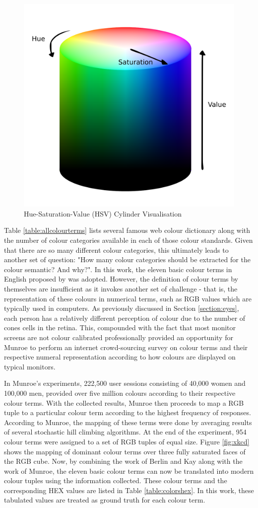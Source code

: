 \begin{figure}[hbt!]\centering
\includegraphics[width=.5\textwidth]{image/general/HSV.png}
\caption{Hue-Saturation-Value (HSV) Cylinder Visualisation}
\label{fig:hsvcylinder}
\end{figure}



Table \ref{table:allcolourterms} lists several famous web colour dictionary along with the number of colour categories available in each of those colour standards. Given that there are so many different colour categories, this ultimately leads to another set of question: "How many colour categories should be extracted for the colour semantic? And why?". In this work, the eleven basic colour terms in English proposed by \cite{berlinandkay} was adopted.
However, the definition of colour terms by themselves are insufficient as it invokes another set of challenge - that is, the representation of these colours in numerical terms, such as RGB values which are typically used in computers. As previously discussed in Section \ref{section:eyes}, each person has a relatively different perception of colour due to the number of cones cells in the retina. This, compounded with the fact that most monitor screens are not colour calibrated professionally provided an opportunity for Munroe \cite{munroe2010color} to perform an internet crowd-sourcing survey on colour terms and their respective numeral representation according to how colours are displayed on typical monitors.

In Munroe's experiments, 222,500 user sessions consisting of 40,000 women and 100,000 men, provided over five million colours according to their respective colour terms. With the collected results, Munroe then proceeds to map a RGB tuple to a particular colour term according to the highest frequency of responses. According to Munroe, the mapping of these terms were done by averaging results of several stochastic hill climbing algorithms. At the end of the experiment, 954 colour terms were assigned to a set of RGB tuples of equal size. Figure \ref{fig:xkcd} shows the mapping of dominant colour terms over three fully saturated faces of the RGB cube. Now, by combining the work of Berlin and Kay along with the work of Munroe, the eleven basic colour terms can now be translated into modern colour tuples using the information collected. These colour terms and the corresponding HEX values are listed in Table \ref{table:colorshex}. In this work, these tabulated values are treated as ground truth for each colour term. 


